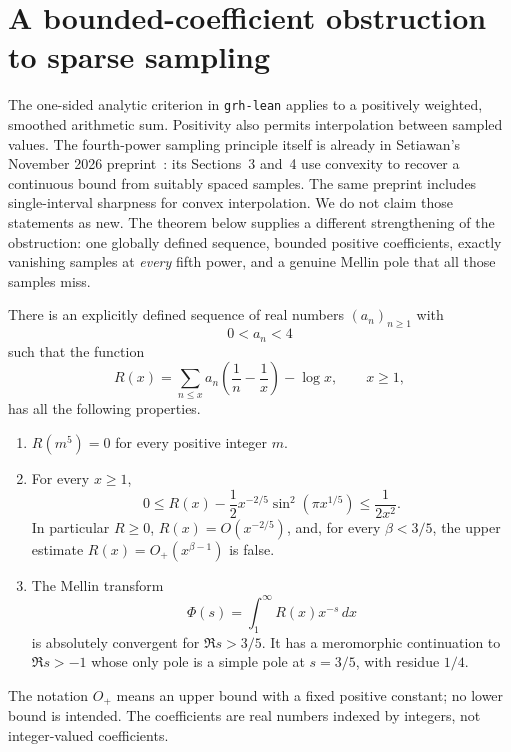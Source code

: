 
\section{A bounded-coefficient obstruction to sparse sampling}
\label{sec:sampling-obstruction}

The one-sided analytic criterion in \texttt{grh-lean} applies to a
positively weighted, smoothed arithmetic sum.  Positivity also permits
interpolation between sampled values.  The fourth-power sampling principle
itself is already in Setiawan's November 2026 preprint~\cite{Setiawan2026}: its Sections~3 and~4
use convexity to recover a continuous bound from
suitably spaced samples.  The same preprint includes single-interval
sharpness for convex interpolation.  We do not claim those statements as
new.  The theorem below supplies a different strengthening of the
obstruction: one globally defined sequence, bounded positive coefficients,
exactly vanishing samples at \emph{every} fifth power, and a genuine Mellin
pole that all those samples miss.

\begin{theorem}
\label{thm:invisible-pole}
There is an explicitly defined sequence of real numbers $(a_n)_{n\geq1}$
with
\[
                         0<a_n<4
\]
such that the function
\[
 R(x)=\sum_{n\leq x}a_n\left(\frac1n-\frac1x\right)-\log x,
                    \qquad x\geq1,
\]
has all the following properties.
\begin{enumerate}
\item $R(m^5)=0$ for every positive integer $m$.
\item For every $x\geq1$,
\[
0\leq R(x)-\frac12 x^{-2/5}\sin^2(\pi x^{1/5})
                       \leq \frac1{2x^2}.
\tag{S1}\label{eq:sampling-error}
\]
In particular $R\geq0$, $R(x)=O(x^{-2/5})$, and, for every
$\beta<3/5$, the upper estimate $R(x)=O_+(x^{\beta-1})$ is false.
\item The Mellin transform
\[
                  \Phi(s)=\int_1^\infty R(x)x^{-s}\,dx
\]
is absolutely convergent for $\Re s>3/5$.  It has a meromorphic
continuation to $\Re s>-1$ whose only pole is a simple pole at $s=3/5$,
with residue $1/4$.
\end{enumerate}
The notation $O_+$ means an upper bound with a fixed positive constant;
no lower bound is intended.  The coefficients are real numbers indexed
by integers, not integer-valued coefficients.
\end{theorem}

